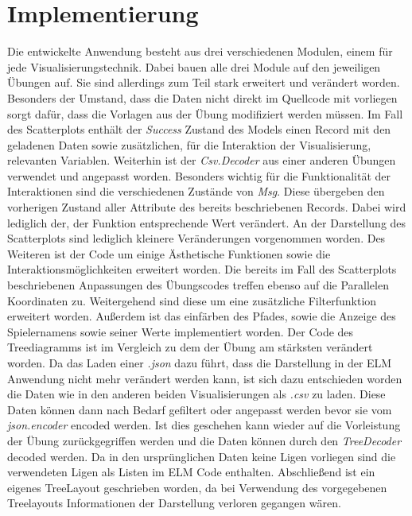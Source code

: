 \documentclass[usegeometry=true]{scrartcl}
\begin{document}
\section{Implementierung}

Die entwickelte Anwendung besteht aus drei verschiedenen Modulen, einem für jede Visualisierungstechnik. Dabei bauen alle drei Module auf den jeweiligen Übungen auf. Sie sind allerdings zum Teil stark erweitert und verändert worden.
Besonders der Umstand, dass die Daten nicht direkt im Quellcode mit vorliegen sorgt dafür, dass die Vorlagen aus der Übung modifiziert werden müssen.
Im Fall des Scatterplots enthält der \textit{Success} Zustand des Models einen Record mit den geladenen Daten sowie zusätzlichen, für die Interaktion der Visualisierung, relevanten Variablen. Weiterhin ist der \textit{Csv.Decoder} aus einer anderen Übungen verwendet und angepasst worden.
Besonders wichtig für die Funktionalität der Interaktionen sind die verschiedenen Zustände von \textit{Msg}. Diese übergeben den vorherigen Zustand aller Attribute des bereits beschriebenen Records. Dabei wird lediglich der, der Funktion entsprechende Wert verändert. An der Darstellung des Scatterplots sind lediglich kleinere Veränderungen vorgenommen worden. Des Weiteren ist der Code um einige Ästhetische Funktionen sowie die Interaktionsmöglichkeiten erweitert worden.
Die bereits im Fall des Scatterplots beschriebenen Anpassungen des Übungscodes treffen ebenso auf die Parallelen Koordinaten zu. Weitergehend sind diese um eine zusätzliche Filterfunktion erweitert worden. Außerdem ist das einfärben des Pfades, sowie die Anzeige des Spielernamens sowie seiner Werte implementiert worden.
Der Code des Treediagramms ist im Vergleich zu dem der Übung am stärksten verändert worden. Da das Laden einer \textit{.json} dazu führt, dass die Darstellung in der ELM Anwendung nicht mehr verändert werden kann, ist sich dazu entschieden worden die Daten wie in den anderen beiden Visualisierungen als \textit{.csv} zu laden. Diese Daten können dann nach Bedarf gefiltert oder angepasst werden bevor sie vom \textit{json.encoder} encoded werden. Ist dies geschehen kann wieder auf die Vorleistung der Übung zurückgegriffen werden und die Daten können durch den \textit{TreeDecoder} decoded werden. Da in den ursprünglichen Daten keine Ligen vorliegen sind die verwendeten Ligen als Listen im ELM Code enthalten. Abschließend ist ein eigenes TreeLayout geschrieben worden, da bei Verwendung des vorgegebenen Treelayouts Informationen der Darstellung verloren gegangen wären.
\end{document}
